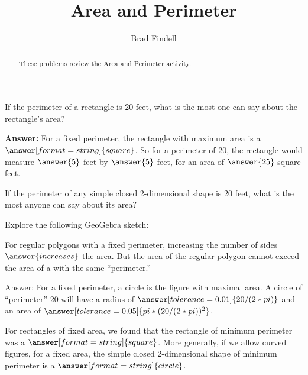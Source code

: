 \documentclass[nooutcomes]{ximera}
\title{Area and Perimeter}
\author{Brad Findell}
\begin{document}
\begin{abstract}
These problems review the Area and Perimeter activity.  
\end{abstract}
\maketitle

%
%
%
%

\begin{problem}
If the perimeter of a rectangle is 20 feet, what is the most one can say about the rectangle's area? 

\textbf{Answer:}  For a fixed perimeter, the rectangle with maximum area is a $\answer[format=string]{square}$.  So for a perimeter of 20, the rectangle would measure $\answer{5}$ feet by $\answer{5}$ feet, for an area of $\answer{25}$ square feet.  

\begin{problem}
If the perimeter of any simple closed 2-dimensional shape is 20 feet, what is the most anyone can say about its area?

Explore the following GeoGebra sketch:  
\begin{center}  
\end{center}
For regular polygons with a fixed perimeter, increasing the number of sides
$\answer{increases}$ the area.  But the area of the regular polygon cannot 
exceed the area of a 
with the same ``perimeter.''

\begin{problem}
Answer: For a fixed perimeter, a circle is the figure with maximal area.  A circle of ``perimeter'' 20 will have a radius of $\answer[tolerance=0.01]{20/(2*pi)}$ and an area of 
$\answer[tolerance=0.05]{pi*(20/(2*pi))^2}$.  
\end{problem}
\end{problem}
\end{problem}

\begin{problem}
For rectangles of fixed area, we found that the rectangle of minimum perimeter was a 
$\answer[format=string]{square}$.  More generally, if we allow curved figures, for a fixed area, the simple closed 2-dimensional shape of minimum perimeter is a $\answer[format=string]{circle}$.  
\end{problem}
\end{document}
